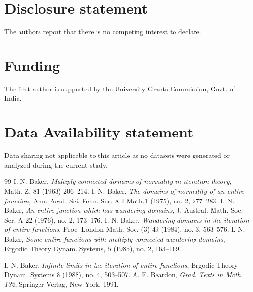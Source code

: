 \documentclass[11pt,a4paper]{article}
\begin{document}
\section{Disclosure statement}
The authors report that there is no competing interest to declare.
\section{Funding}
The first author is supported by the University Grants Commission, Govt. of India.
 \section{Data Availability statement} Data sharing not applicable to this article as no datasets were generated or analyzed during the current study.
\begin{thebibliography}{99}
	I. N. Baker, \emph{Multiply-connected domains of normality in iteration theory}, Math. Z. 81 (1963) 206–214.
	I. N. Baker,  \emph{The domains of normality of an entire function}, Ann. Acad. Sci. Fenn. Ser. A I Math.1 (1975), no. 2, 277–283.
	I. N. Baker,  \emph{An entire function which has wandering domains}, J. Austral. Math. Soc. Ser. A 22 (1976), no. 2, 173–176.
	I. N. Baker,\emph{ Wandering domains in the iteration of entire functions}, Proc. London Math. Soc. (3) 49 (1984), no. 3, 563–576.
	 I. N. Baker,\emph{ Some entire functions with multiply-connected wandering domains}, Ergodic Theory Dynam. Systems, 5 (1985), no. 2, 163–169.
	
	 I. N. Baker,\emph{ Infinite limits in the iteration of entire functions}, Ergodic Theory Dynam. Systems 8 (1988), no. 4, 503–507.
	  A. F. Beardon, \emph{Grad. Texts in Math. 132}, Springer-Verlag, New York, 1991.
	

\end{thebibliography}
\end{document}
